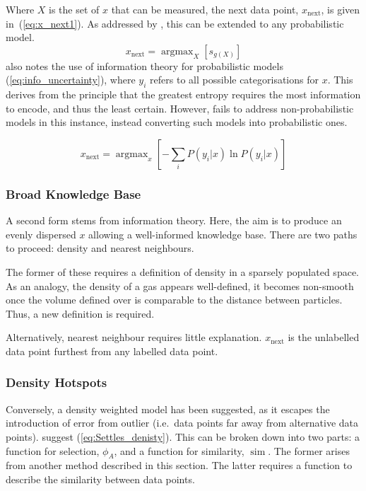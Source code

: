 \documentclass[a4paper, english]{report}
\DeclareMathOperator*{\argmax}{argmax}
\DeclareMathOperator*{\simm}{sim}
\begin{document}
Where $X$ is the set of $x$ that can be measured, the next data point, $x_\mathrm{next}$, is given in~(\ref{eq:x_next1}). As addressed by \textcite{LitRev_2009}, this can be extended to any probabilistic model.
\begin{equation}
    \label{eq:x_next1}
    x_\mathrm{next}=\argmax_X{\left[s_{g(X)}\right]}
\end{equation}
\textcite{LitRev_2009} also notes the use of information theory for probabilistic models (\ref{eq:info_uncertainty}), where $y_i$ refers to all possible categorisations for $x$. This derives from the principle that the greatest entropy requires the most information to encode, and thus the least certain. However, \textcite{LitRev_2009} fails to address non-probabilistic models in this instance, instead converting such models into probabilistic ones.

\begin{equation}
    \label{eq:info_uncertainty}
    x_\mathrm{next}=\argmax_x{\left[-\sum_i{P(y_i|x)\ln{P(y_i|x)}}\right]}
\end{equation}

\subsubsection{Broad Knowledge Base}
A second form stems from information theory. Here, the aim is to produce an evenly dispersed $x$ allowing a well-informed knowledge base. There are two paths to proceed: density and nearest neighbours.

The former of these requires a definition of density in a sparsely populated space. As an analogy, the density of a gas appears well-defined, it becomes non-smooth once the volume defined over is comparable to the distance between particles. Thus, a new definition is required.

Alternatively, nearest neighbour requires little explanation. $x_\mathrm{next}$ is the unlabelled data point furthest from any labelled data point.

\subsubsection{Density Hotspots}
Conversely, a density weighted model has been suggested, as it escapes the introduction of error from outlier (i.e.\ data points far away from alternative data points). \textcite{Settles_2008} suggest (\ref{eq:Settles_denisty}). This can be broken down into two parts: a function for selection, $\phi_A$, and a function for similarity, $\simm$. The former arises from  another method described in this section. The latter requires a function to describe the similarity between data points.
\end{document}

